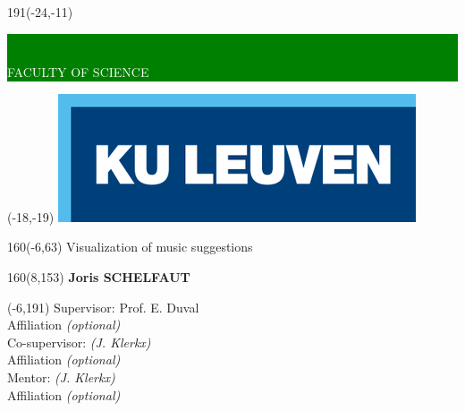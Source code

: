 \documentclass[12pt,a4paper,oneside]{book}
\begin{document}
\thispagestyle{empty}
\newcommand{\form}[1]{\scalebox{1.087}{\boldmath{#1}}}
\sffamily
%
\begin{textblock}{191}(-24,-11)
	\colorbox{green}{\hspace{139mm}\ \parbox[c][18truemm]{52mm}{\textcolor{white}{FACULTY OF SCIENCE}}}
\end{textblock}
%
\begin{textblock}{70}(-18,-19)
	\textblockcolour{}
	\includegraphics*[height=19.8truemm]{LogoKULeuven}
\end{textblock}
%
\begin{textblock}{160}(-6,63)
	\textblockcolour{}
	\vspace{-\parskip}
	\flushleft
	\fontsize{40}{42}\selectfont \textcolor{bluetitle}{Visualization of music suggestions}\\[1.5mm]
	\fontsize{20}{22}\selectfont {A visual explanation system for collaborative filtering}
\end{textblock}
%
%
\begin{textblock}{160}(8,153)
\textblockcolour{}
\vspace{-\parskip}
\flushright
\fontsize{14}{16}\selectfont \textbf{Joris SCHELFAUT}
\end{textblock}
%
\begin{textblock}{70}(-6,191)
\textblockcolour{}
\vspace{-\parskip}
\flushleft
Supervisor: Prof. E. Duval\\[-2pt]
\textcolor{blueaff}{Affiliation \textsl{(optional)}}\\[5pt]
Co-supervisor: \textsl{(J. Klerkx)}\\[-2pt]
\textcolor{blueaff}{Affiliation \textsl{(optional)}}\\[5pt]
Mentor: \textsl{(J. Klerkx)}\\[-2pt]
\textcolor{blueaff}{Affiliation \textsl{(optional)}}\\
\end{textblock}
\end{document}
